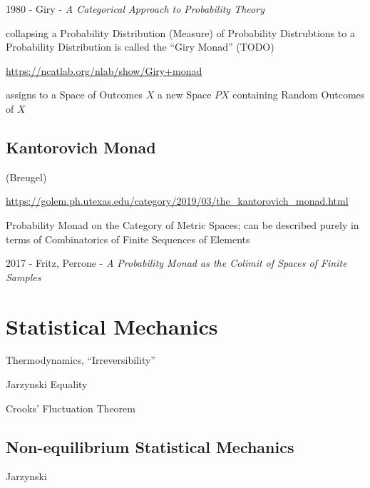 1980 - Giry - \emph{A Categorical Approach to Probability Theory}

collapsing a Probability Distribution (Measure) of Probability Distrubtions to a
Probability Distribution is called the ``Giry Monad'' (TODO)

\url{https://ncatlab.org/nlab/show/Giry+monad}

assigns to a Space of Outcomes $X$ a new Space $P X$ containing Random Outcomes
of $X$



\subsection{Kantorovich Monad}\label{sec:kantorovich_monad}

(Breugel)

\url{https://golem.ph.utexas.edu/category/2019/03/the_kantorovich_monad.html}

Probability Monad on the Category of Metric Spaces; can be described purely in
terms of Combinatorics of Finite Sequences of Elements

2017 - Fritz, Perrone - \emph{A Probability Monad as the Colimit of Spaces of
  Finite Samples}



\section{Statistical Mechanics}\label{sec:statistical_mechanics}

Thermodynamics, ``Irreversibility''

Jarzynski Equality

Crooks' Fluctuation Theorem



\subsection{Non-equilibrium Statistical Mechanics}
\label{sec:nonequilibrium_statistical_mechanics}

Jarzynski



